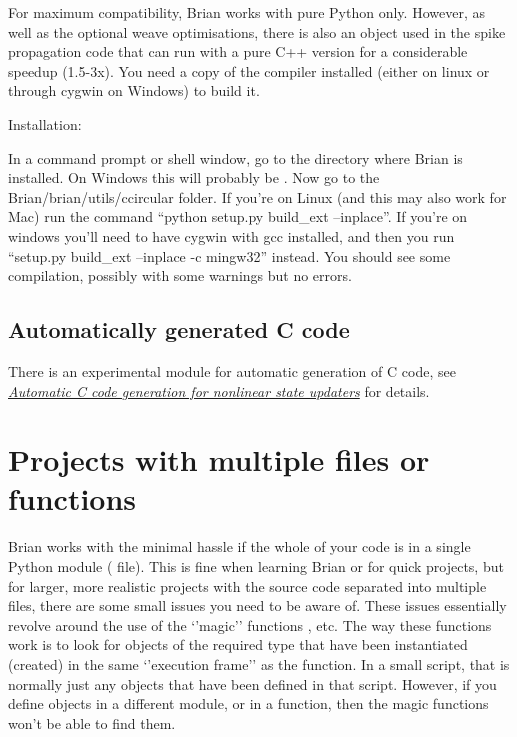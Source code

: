 \documentclass[letterpaper,10pt,english]{manual}
\begin{document}
For maximum compatibility, Brian works with pure Python only. However, as well as the optional
weave optimisations, there is also an object used in the spike propagation code that can run
with a pure C++ version for a considerable speedup (1.5-3x). You need a copy of the  compiler
installed (either on linux or through cygwin on Windows) to build it.

Installation:

In a command prompt or shell window, go to the directory where Brian is installed. On Windows this
will probably be . Now
go to the Brian/brian/utils/ccircular folder. If you're on Linux (and this may also work for Mac) run
the command ``python setup.py build\_ext --inplace''. If you're on windows you'll need to have cygwin with gcc
installed, and then you run ``setup.py build\_ext --inplace -c mingw32'' instead. You should see some
compilation, possibly with some warnings but no errors.


\subsection{Automatically generated C code}

There is an experimental module for automatic generation of C code, see \hyperlink{ccodegen}{\emph{Automatic C code generation for nonlinear state updaters}} for details.

\resetcurrentobjects
\hypertarget{--doc-tasks_multiplefiles}{}

\hypertarget{projects-with-multiple-files}{}\section{Projects with multiple files or functions}

Brian works with the minimal hassle if the whole of your code is in a
single Python module ( file). This is fine when learning Brian
or for quick projects, but for larger, more realistic projects with
the source code separated into multiple files, there are some small
issues you need to be aware of. These issues essentially revolve
around the use of the `'magic'' functions \hyperlink{brian.run}{}, etc. The way
these functions work is to look for objects of the required type that
have been instantiated (created) in the same `'execution frame'' as
the \hyperlink{brian.run}{} function. In a small script, that is normally just
any objects that have been defined in that script. However, if you
define objects in a different module, or in a function, then the
magic functions won't be able to find them.
\end{document}
